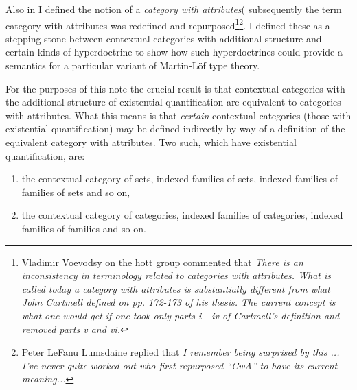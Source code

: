 \documentclass[14pt,a4paper]{scrartcl}
\begin{document}
\noindent
Also in \cite{Cartmell78} I defined the notion of a \textit{category with attributes}(
subsequently the term category with attributes was redefined and repurposed\footnote{Vladimir Voevodsy on the hott group commented 
that \textit {There is an inconsistency in terminology related to categories with attributes. 
What is called today a category with attributes is substantially different from what John Cartmell defined on pp. 172-173 of his thesis. The current concept is what one would get if one took only parts i - iv of Cartmell's definition and removed parts v and vi.}}\footnote{Peter LeFanu Lumsdaine replied that \textit{
I remember being surprised  by this ... I’ve never quite worked out who first repurposed “CwA” to have its current meaning...}}.
I defined these as a stepping stone between contextual categories with additional structure and certain kinds of hyperdoctrine to show how such hyperdoctrines could provide a semantics for
a particular variant of Martin-L\"of type theory.  

For the purposes of this note the crucial result is that contextual categories with the additional structure of existential quantification are equivalent to categories with attributes.
What this means is that \textit{certain} contextual 
categories (those with existential quantification) may be defined indirectly by way of a definition of the equivalent category with attributes. Two such, which have existential quantification, are:
\begin{enumerate}
\item the contextual category  of sets, indexed families of sets, indexed families of families of sets and so on,
\item the contextual category of categories, indexed families of categories, indexed families of families and so on.
\end{enumerate}
\end{document}
